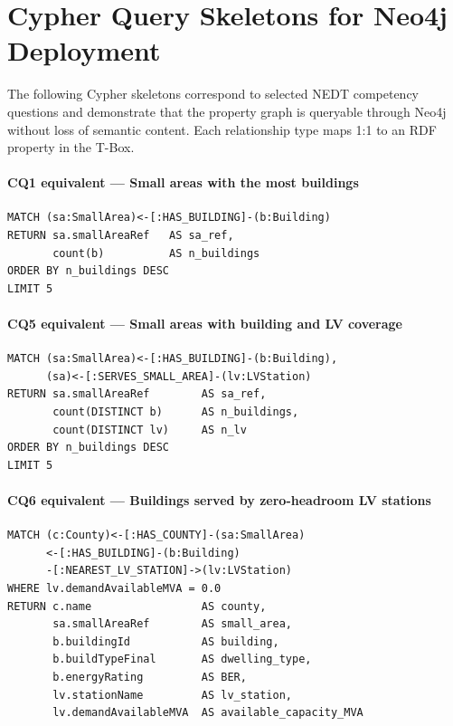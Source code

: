 \documentclass[preprint,12pt]{elsarticle}
\begin{document}
\section{Cypher Query Skeletons for Neo4j Deployment}
\label{app:cypher-skeletons}

The following Cypher skeletons correspond to selected NEDT competency
questions and demonstrate that the property graph is queryable through
Neo4j without loss of semantic content. Each relationship type maps 1:1
to an RDF property in the T-Box.

\paragraph{CQ1 equivalent --- Small areas with the most buildings}
\begin{verbatim}
MATCH (sa:SmallArea)<-[:HAS_BUILDING]-(b:Building)
RETURN sa.smallAreaRef   AS sa_ref,
       count(b)          AS n_buildings
ORDER BY n_buildings DESC
LIMIT 5
\end{verbatim}

\paragraph{CQ5 equivalent --- Small areas with building and LV coverage}
\begin{verbatim}
MATCH (sa:SmallArea)<-[:HAS_BUILDING]-(b:Building),
      (sa)<-[:SERVES_SMALL_AREA]-(lv:LVStation)
RETURN sa.smallAreaRef        AS sa_ref,
       count(DISTINCT b)      AS n_buildings,
       count(DISTINCT lv)     AS n_lv
ORDER BY n_buildings DESC
LIMIT 5
\end{verbatim}

\paragraph{CQ6 equivalent --- Buildings served by zero-headroom LV stations}
\begin{verbatim}
MATCH (c:County)<-[:HAS_COUNTY]-(sa:SmallArea)
      <-[:HAS_BUILDING]-(b:Building)
      -[:NEAREST_LV_STATION]->(lv:LVStation)
WHERE lv.demandAvailableMVA = 0.0
RETURN c.name                 AS county,
       sa.smallAreaRef        AS small_area,
       b.buildingId           AS building,
       b.buildTypeFinal       AS dwelling_type,
       b.energyRating         AS BER,
       lv.stationName         AS lv_station,
       lv.demandAvailableMVA  AS available_capacity_MVA
\end{verbatim}
\end{document}
